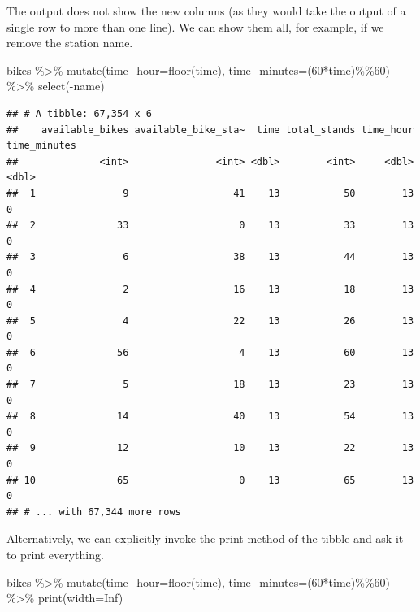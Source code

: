 \documentclass[
]{book}
\newenvironment{Shaded}{\begin{snugshade}}{\end{snugshade}}
\newcommand{\AttributeTok}[1]{\textcolor[rgb]{0.77,0.63,0.00}{#1}}
\newcommand{\ConstantTok}[1]{\textcolor[rgb]{0.00,0.00,0.00}{#1}}
\newcommand{\DecValTok}[1]{\textcolor[rgb]{0.00,0.00,0.81}{#1}}
\newcommand{\FunctionTok}[1]{\textcolor[rgb]{0.00,0.00,0.00}{#1}}
\newcommand{\NormalTok}[1]{#1}
\newcommand{\SpecialCharTok}[1]{\textcolor[rgb]{0.00,0.00,0.00}{#1}}
\begin{document}
The output does not show the new columns (as they would take the output of a single row to more than one line). We can show them all, for example, if we remove the station name.

\begin{Shaded}
\begin{Highlighting}[]
\NormalTok{bikes }\SpecialCharTok{\%\textgreater{}\%}
  \FunctionTok{mutate}\NormalTok{(}\AttributeTok{time\_hour=}\FunctionTok{floor}\NormalTok{(time), }\AttributeTok{time\_minutes=}\NormalTok{(}\DecValTok{60}\SpecialCharTok{*}\NormalTok{time)}\SpecialCharTok{\%\%}\DecValTok{60}\NormalTok{) }\SpecialCharTok{\%\textgreater{}\%}
  \FunctionTok{select}\NormalTok{(}\SpecialCharTok{{-}}\NormalTok{name)}
\end{Highlighting}
\end{Shaded}

\begin{verbatim}
## # A tibble: 67,354 x 6
##    available_bikes available_bike_sta~  time total_stands time_hour time_minutes
##              <int>               <int> <dbl>        <int>     <dbl>        <dbl>
##  1               9                  41    13           50        13            0
##  2              33                   0    13           33        13            0
##  3               6                  38    13           44        13            0
##  4               2                  16    13           18        13            0
##  5               4                  22    13           26        13            0
##  6              56                   4    13           60        13            0
##  7               5                  18    13           23        13            0
##  8              14                  40    13           54        13            0
##  9              12                  10    13           22        13            0
## 10              65                   0    13           65        13            0
## # ... with 67,344 more rows
\end{verbatim}

Alternatively, we can explicitly invoke the print method of the tibble and ask it to print everything.

\begin{Shaded}
\begin{Highlighting}[]
\NormalTok{bikes }\SpecialCharTok{\%\textgreater{}\%}
  \FunctionTok{mutate}\NormalTok{(}\AttributeTok{time\_hour=}\FunctionTok{floor}\NormalTok{(time), }\AttributeTok{time\_minutes=}\NormalTok{(}\DecValTok{60}\SpecialCharTok{*}\NormalTok{time)}\SpecialCharTok{\%\%}\DecValTok{60}\NormalTok{) }\SpecialCharTok{\%\textgreater{}\%}
  \FunctionTok{print}\NormalTok{(}\AttributeTok{width=}\ConstantTok{Inf}\NormalTok{)}
\end{Highlighting}
\end{Shaded}
\end{document}
